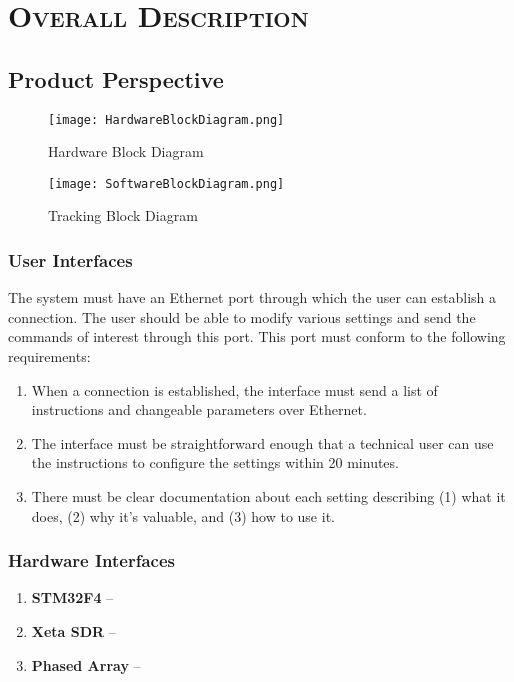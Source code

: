 \documentclass[ProjectRequirements.tex]{subfiles}
\begin{document}
\bigskip

\section{\textsc{\Large Overall Description}}
	\subsection{Product Perspective}
	\begin{figure}[H]
		\centering
		\texttt{[image: HardwareBlockDiagram.png]}
		\caption{Hardware Block Diagram \label{fig:HardwareBlockDiagram}}
	\end{figure}
	\begin{figure}[H]
		\centering
		\texttt{[image: SoftwareBlockDiagram.png]}
		\caption{Tracking Block Diagram \label{fig:SoftwareBlockDiagram}}
	\end{figure}
			
		\subsubsection{User Interfaces}
			The system must have an Ethernet port through which the user can establish a connection. The user should be able to modify various settings and send the commands of interest through this port. This port must conform to the following requirements:
			\begin{enumerate}
				\item When a connection is established, the interface must send a list of instructions and changeable parameters over Ethernet.
				\item The interface must be straightforward enough that a technical user can use the instructions to configure the settings within 20 minutes.
				\item There must be clear documentation about each setting describing (1) what it does, (2) why it's valuable, and (3) how to use it.
			\end{enumerate}	
			
		\subsubsection{Hardware Interfaces}
			\begin{enumerate}\itemsep1pt
				\item \textbf{STM32F4} -- 
				\item \textbf{Xeta SDR} -- 
				\item \textbf{Phased Array} -- 
			\end{enumerate}
			
\end{document}
